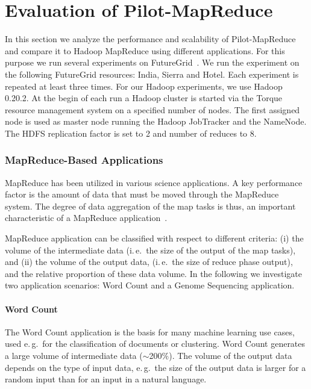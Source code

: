 \documentclass[12pt]{report}
\newcommand{\upp}{\vspace*{-0.5em}}
\newcommand{\pilotmapreduce}{Pilot-MapReduce\xspace}
\begin{document}
\chapter{Evaluation of \pilotmapreduce} \label{chap:pilot-app}

In this section we analyze the performance and scalability of
\pilotmapreduce and compare it to Hadoop MapReduce using different
applications. For this purpose we run several experiments on
FutureGrid~\cite{fg}. We run the experiment on the following
FutureGrid resources: India, Sierra and Hotel. Each experiment is
repeated at least three times. For our Hadoop experiments, we use
Hadoop 0.20.2. At the begin of each run a Hadoop cluster is started
via the Torque resource management system on a specified number of
nodes. The first assigned node is used as master node running the
Hadoop JobTracker and the NameNode. The HDFS replication factor is set
to 2 and number of reduces to 8.
\upp
\subsection{MapReduce-Based Applications}

MapReduce has been utilized in various science applications. A key performance 
factor is the amount of data that must be moved through the MapReduce system. 
The degree of data aggregation of the map tasks is thus, an important 
characteristic of a MapReduce application~\cite{weissman-mr-11}.

MapReduce application can be classified with respect to different
criteria: (i) the volume of the intermediate data (i.\,e.\ the size of
the output of the map tasks), and (ii) the volume of the output data,
(i.\,e.\ the size of reduce phase output), and the relative proportion
of these data volume. In the following we investigate two application
scenarios: Word Count and a Genome Sequencing application.

\upp
\subsubsection*{Word Count}

The Word Count application is the basis for many machine learning use cases, 
used e.\,g.\ for the classification of documents or clustering. Word Count 
generates a large volume of intermediate data ($\sim$200$\%$). The volume of the 
output data depends on the type of input data, e.\,g.\ the size of the output data is 
larger for a random input than for an input in a natural language. 
\end{document}

